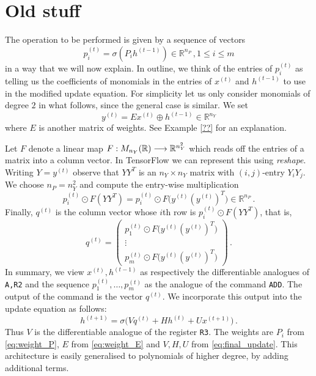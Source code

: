 \documentclass[english,letter paper,12pt,leqno]{article}
\theoremstyle{example}
\numberwithin{equation}{section}
\def\be{\begin{equation}}
\def\ee{\end{equation}}
\begin{document}
\section{Old stuff}

The operation to be performed is given by a sequence of vectors
\be\label{eq:weight_P}
p^{(t)}_i = \sigma( P_i h^{(t-1)} ) \in \mathbb{R}^{n_P}\,, 1 \le i \le m
\ee
in a way that we will now explain. In outline, we think of the entries of $p^{(t)}_i$ as telling us the coefficients of monomials in the entries of $x^{(t)}$ and $h^{(t-1)}$ to use in the modified update equation. For simplicity let us only consider monomials of degree $2$ in what follows, since the general case is similar. We set
\be\label{eq:weight_E}
y^{(t)} = E x^{(t)} \oplus h^{(t-1)} \in \mathbb{R}^{n_Y}
\ee
where $E$ is another matrix of weights. See Example \ref{??} for an explanation.

Let $F$ denote a linear map $F: M_{n_Y}(\mathbb{R}) \longrightarrow \mathbb{R}^{n_Y^2}$ which reads off the entries of a matrix into a column vector. In TensorFlow we can represent this using \emph{reshape}. Writing $Y = y^{(t)}$ observe that $Y Y^T$ is an $n_Y \times n_Y$ matrix with $(i,j)$-entry $Y_i Y_j$. We choose $n_P = n_Y^2$ and compute the entry-wise multiplication
\[
p^{(t)}_i \odot F(Y Y^T) = p^{(t)}_i \odot F\big( y^{(t)} ( y^{(t)} )^T \big) \in \mathbb{R}^{n_P}\,.
\]
Finally, $q^{(t)}$ is the column vector whose $i$th row is $p^{(t)}_i \odot F(Y Y^T)$, that is,
\[
q^{(t)} = \begin{pmatrix} p^{(t)}_1 \odot F\big( y^{(t)} ( y^{(t)} )^T \big) \\
\vdots\\
p^{(t)}_m \odot F\big( y^{(t)} ( y^{(t)} )^T \big) \end{pmatrix}\,.
\] 
In summary, we view $x^{(t)}, h^{(t-1)}$ as respectively the differentiable analogues of \verb+A,R2+ and the sequence $p^{(t)}_1, \ldots, p^{(t)}_m$ as the analogue of the command \verb+ADD+. The output of the command is the vector $q^{(t)}$. We incorporate this output into the update equation as follows:
\be\label{eq:final_update}
h^{(t+1)} = \sigma\big( V q^{(t)} + H h^{(t)} + U x^{(t+1)} \big)\,.
\ee
Thus $V$ is the differentiable analogue of the register \verb+R3+. The weights are $P_i$ from \eqref{eq:weight_P}, $E$ from \eqref{eq:weight_E} and $V, H, U$ from \eqref{eq:final_update}. This architecture is easily generalised to polynomials of higher degree, by adding additional terms.
\end{document}
